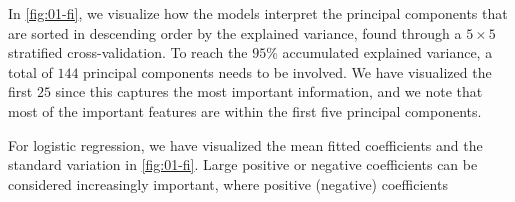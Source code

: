 

In \autoref{fig:01-fi}, we visualize how the models interpret the principal components that are sorted in descending order by the explained variance, found through a $5\times 5$ stratified cross-validation. To reach the $95\%$ accumulated explained variance, a total of $144$ principal components needs to be involved. We have visualized the first $25$ since this captures the most important information, and we note that most of the important features are within the first five principal components.

For logistic regression, we have visualized the mean fitted coefficients and the standard variation in \autoref{fig:01-fi}. Large positive or negative coefficients can be considered increasingly important, where positive (negative) coefficients

